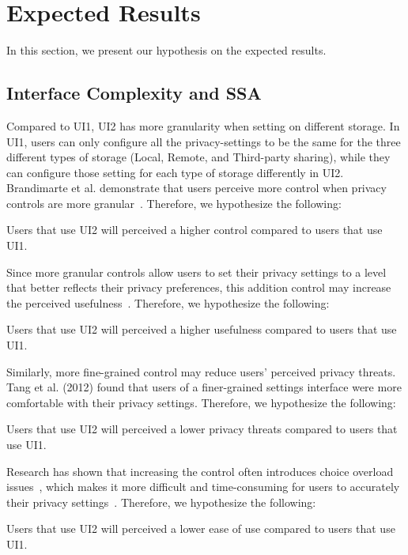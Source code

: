 \section{Expected Results}
In this section, we present our hypothesis on the expected results.

\subsection{Interface Complexity and SSA}
Compared to UI1, UI2 has more granularity when setting on different storage. In UI1, users can only configure all the privacy-settings to be the same for the three different types of storage (Local, Remote, and Third-party sharing), while they can configure those setting for each type of storage differently in UI2. Brandimarte et al. demonstrate that users perceive more control when privacy controls are more granular~\cite{brandimarte2013misplaced}. Therefore, we hypothesize the following:
\theoremgroup
\begin{theorem}
	Users that use UI2 will perceived  a higher control compared to users that use UI1.
\end{theorem}

Since more granular controls allow users to set their privacy settings to a level that better reflects their privacy preferences, this addition control may increase the perceived usefulness~\cite{tang2012implications, al2016modeling}. Therefore, we hypothesize the following:
\begin{theorem}
	Users that use UI2 will perceived a higher usefulness compared to users that use UI1.
\end{theorem}

Similarly, more fine-grained control may reduce users' perceived privacy threats. Tang et al. (2012) found that users of a finer-grained settings interface were more comfortable with their privacy settings. Therefore, we hypothesize the following:
\begin{theorem}
	Users that use UI2 will perceived a lower privacy threats compared to users that use UI1.
\end{theorem}

Research has shown that increasing the control often introduces choice overload issues~\cite{iyengar2000choice, schwartz2004paradox, acquisti2005privacy, acquisti2007can}, which makes it more difficult and time-consuming for users to accurately their privacy settings~\cite{madejski2012study, sadeh2009understanding}. Therefore, we hypothesize the following:
\begin{theorem}
	Users that use UI2 will perceived a lower ease of use compared to users that use UI1.
\end{theorem}

